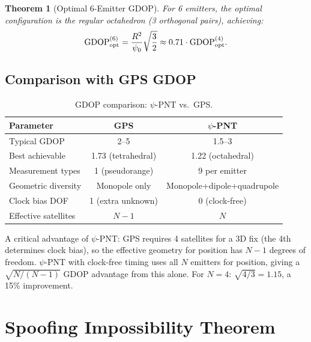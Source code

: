 \documentclass[twocolumn,superscriptaddress,prd,nofootinbib]{revtex4-2}
\newcommand{\GDOP}{\mathrm{GDOP}}
\newtheorem{theorem}{Theorem}
\begin{document}
\begin{theorem}[Optimal 6-Emitter GDOP]\label{thm:6emit}
For 6 emitters, the optimal configuration is the regular octahedron
(3 orthogonal pairs), achieving:
\begin{equation}
\GDOP_{\rm opt}^{(6)} = \frac{R^2}{\psi_0}\sqrt{\frac{3}{2}}
\approx 0.71\cdot\GDOP_{\rm opt}^{(4)}.
\end{equation}
\end{theorem}

\subsection{Comparison with GPS GDOP}

\begin{table}[t]
\caption{GDOP comparison: $\psi$-PNT vs.\ GPS.}
\label{tab:gdop-compare}
\begin{ruledtabular}
\begin{tabular}{lcc}
Parameter & GPS & $\psi$-PNT \\
\hline
Typical GDOP & 2--5 & 1.5--3 \\
Best achievable & 1.73 (tetrahedral) & 1.22 (octahedral) \\
Measurement types & 1 (pseudorange) & 9 per emitter \\
Geometric diversity & Monopole only & Monopole+dipole+quadrupole \\
Clock bias DOF & 1 (extra unknown) & 0 (clock-free) \\
Effective satellites & $N-1$ & $N$ \\
\end{tabular}
\end{ruledtabular}
\end{table}

A critical advantage of $\psi$-PNT: GPS requires 4 satellites for a 3D
fix (the 4th determines clock bias), so the effective geometry for
position has $N-1$ degrees of freedom. $\psi$-PNT with clock-free
timing uses all $N$ emitters for position, giving a $\sqrt{N/(N-1)}$
GDOP advantage from this alone. For $N = 4$: $\sqrt{4/3} = 1.15$,
a 15\% improvement.

\section{Spoofing Impossibility Theorem}\label{sec:spoofing}
\end{document}
